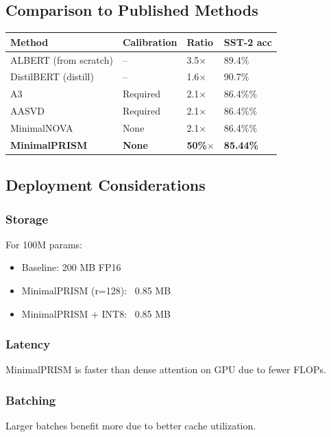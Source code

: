 \subsection{Comparison to Published Methods}

\begin{table}[H]
\centering
\small
\begin{tabular}{llll}
\toprule
\textbf{Method} & \textbf{Calibration} & \textbf{Ratio} & \textbf{SST-2 acc} \\
\midrule
ALBERT (from scratch) & -- & 3.5$\times$ & 89.4\% \\
DistilBERT (distill) & -- & 1.6$\times$ & 90.7\% \\
A3 & Required & 2.1$\times$ & 86.4\%\% \\
AASVD & Required & 2.1$\times$ & 86.4\%\% \\
MinimalNOVA & None & 2.1$\times$ & 86.4\%\% \\
\textbf{MinimalPRISM} & \textbf{None} & \textbf{50\%$\times$} & \textbf{85.44\%} \\
\bottomrule
\end{tabular}
\end{table}

\subsection{Deployment Considerations}

\subsubsection{Storage}
For 100M params:
\begin{itemize}
\item Baseline: 200 MB FP16
\item MinimalPRISM (r=128): ~0.85 MB
\item MinimalPRISM + INT8: ~0.85 MB

\end{itemize}
\subsubsection{Latency}
MinimalPRISM is faster than dense attention on GPU due to fewer FLOPs.

\subsubsection{Batching}
Larger batches benefit more due to better cache utilization.

